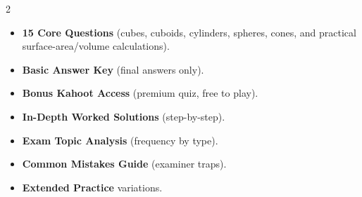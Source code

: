 \documentclass[11pt,a4paper]{article}
\newcommand{\FullReleaseDate}{April 30, 2026}
\begin{document}
\vspace{8pt}

\begin{multicols}{2}
  \begin{tcolorbox}[card, title=\sffamily\bfseries\textcolor{white}{\faHandPointDown\ TODAY (Simplified Version)}, colbacktitle=mainblue, boxed title style={sharp corners, boxrule=0pt}]
    \begin{itemize}[leftmargin=1.2em, itemsep=2pt]
      \item \small \textbf{15 Core Questions} (cubes, cuboids, cylinders, spheres, cones, and practical surface-area/volume calculations).
      \item \small \textbf{Basic Answer Key} (final answers only).
      \item \small \textbf{Bonus Kahoot Access} (premium quiz, free to play).
    \end{itemize}
  \end{tcolorbox}

  \columnbreak

  \begin{tcolorbox}[card, title=\sffamily\bfseries\textcolor{white}{\faRocket\ ON \FullReleaseDate\ (Full Upgrade)}, colbacktitle=mainblue, boxed title style={sharp corners, boxrule=0pt}]
    \begin{itemize}[leftmargin=1.2em, itemsep=2pt]
      \item \small \textbf{In-Depth Worked Solutions} (step-by-step).
      \item \small \textbf{Exam Topic Analysis} (frequency by type).
      \item \small \textbf{Common Mistakes Guide} (examiner traps).
      \item \small \textbf{Extended Practice} variations.
    \end{itemize}
  \end{tcolorbox}
\end{multicols}
\end{document}
